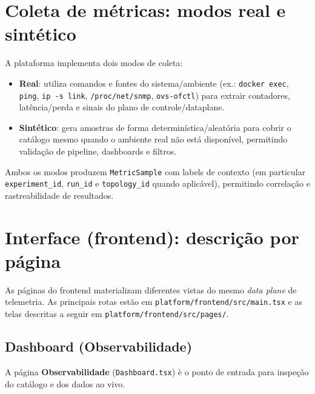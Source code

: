 \documentclass[12pt,oneside]{report}
\begin{document}
\section{Coleta de m\'etricas: modos real e sint\'etico}
A plataforma implementa dois modos de coleta:

\begin{itemize}
\item \textbf{Real}: utiliza comandos e fontes do sistema/ambiente (ex.: \texttt{docker exec}, \texttt{ping}, \texttt{ip -s link}, \texttt{/proc/net/snmp}, \texttt{ovs-ofctl}) para extrair contadores, lat\^encia/perda e sinais do plano de controle/dataplane.
\item \textbf{Sint\'etico}: gera amostras de forma determin\'istica/aleat\'oria para cobrir o cat\'alogo mesmo quando o ambiente real n\~ao est\'a dispon\'ivel, permitindo valida\c{c}\~ao de pipeline, dashboards e filtros.
\end{itemize}

Ambos os modos produzem \texttt{MetricSample} com labels de contexto (em particular \texttt{experiment\_id}, \texttt{run\_id} e \texttt{topology\_id} quando aplic\'avel), permitindo correla\c{c}\~ao e rastreabilidade de resultados.

\section{Interface (frontend): descri\c{c}\~ao por p\'agina}
As p\'aginas do frontend materializam diferentes vistas do mesmo \textit{data plane} de telemetria. As principais rotas est\~ao em \texttt{platform/frontend/src/main.tsx} e as telas descritas a seguir em \texttt{platform/frontend/src/pages/}.

\subsection{Dashboard (Observabilidade)}
A p\'agina \textbf{Observabilidade} (\texttt{Dashboard.tsx}) \`e o ponto de entrada para inspe\c{c}\~ao do cat\'alogo e dos dados ao vivo.
\end{document}
